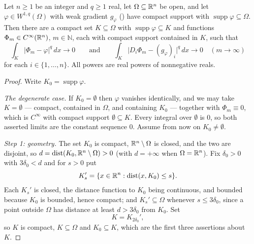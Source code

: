\begin{lemma}
Let $n\ge1$ be an integer and $q\ge1$ real, let $\Omega\subseteq\mathbb{R}^n$ be open,
and let $\varphi\in W^{1,q}(\Omega)$ with weak gradient $g_\varphi$
() have compact support with
$\operatorname{supp}\varphi\subseteq\Omega$.  Then there are a compact set
$K\subseteq\Omega$ with $\operatorname{supp}\varphi\subseteq K$ and functions
$\Phi_m\in C^\infty(\mathbb{R}^n)$, $m\in\mathbb{N}$, each with compact support contained in
$K$, such that
\[
\int_K|\Phi_m-\varphi|^q\,dx\longrightarrow0
\qquad\text{and}\qquad
\int_K\bigl|D_i\Phi_m-(g_\varphi)_i\bigr|^q\,dx\longrightarrow0
\quad(m\to\infty)
\]
for each $i\in\{1,\dots,n\}$.  All powers are real powers of nonnegative reals.
\end{lemma}
\begin{proof}
Write $K_0=\operatorname{supp}\varphi$.

\emph{The degenerate case.}  If $K_0=\emptyset$ then $\varphi$ vanishes
identically, and we may take $K=\emptyset$ --- compact, contained in $\Omega$,
and containing $K_0$ --- together with $\Phi_m\equiv0$, which is $C^\infty$ with
compact support $\emptyset\subseteq K$.  Every integral over $\emptyset$ is $0$,
so both asserted limits are the constant sequence $0$.  Assume from now on
$K_0\ne\emptyset$.

\emph{Step 1: geometry.}  The set $K_0$ is compact, $\mathbb{R}^n\setminus\Omega$ is
closed, and the two are disjoint, so
$d=\operatorname{dist}(K_0,\mathbb{R}^n\setminus\Omega)>0$ (with $d=+\infty$ when
$\Omega=\mathbb{R}^n$).  Fix $\delta_0>0$ with $3\delta_0<d$ and for $s>0$ put
\[
K_s'=\{x\in\mathbb{R}^n:\operatorname{dist}(x,K_0)\le s\} .
\]
Each $K_s'$ is closed, the distance function to $K_0$ being continuous, and
bounded because $K_0$ is bounded, hence compact; and $K_s'\subseteq\Omega$
whenever $s\le3\delta_0$, since a point outside $\Omega$ has distance at least
$d>3\delta_0$ from $K_0$.  Set
\[
K=K_{2\delta_0}' ,
\]
so $K$ is compact, $K\subseteq\Omega$ and $K_0\subseteq K$, which are the first
three assertions about $K$.


\end{proof}
